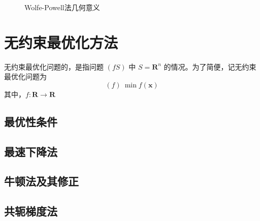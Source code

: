 \documentclass{book}
\begin{document}
\begin{figure}[ht]
    \centering
    
    \caption{Wolfe-Powell法几何意义}
    \label{fig:Axis of Wolfe-Powell method}
\end{figure}

\chapter{无约束最优化方法}

无约束最优化问题的，是指问题 $(fS)$ 中 $S=\mathbf{R}^n$ 的情况。为了简便，记无约束最优化问题为
$$
    (f)\ \min f(\boldsymbol{x})
$$
其中，$f:\mathbf{R}\rightarrow\mathbf{R}$

\section{最优性条件}

\section{最速下降法}

\section{牛顿法及其修正}

\section{共轭梯度法}
\end{document}
